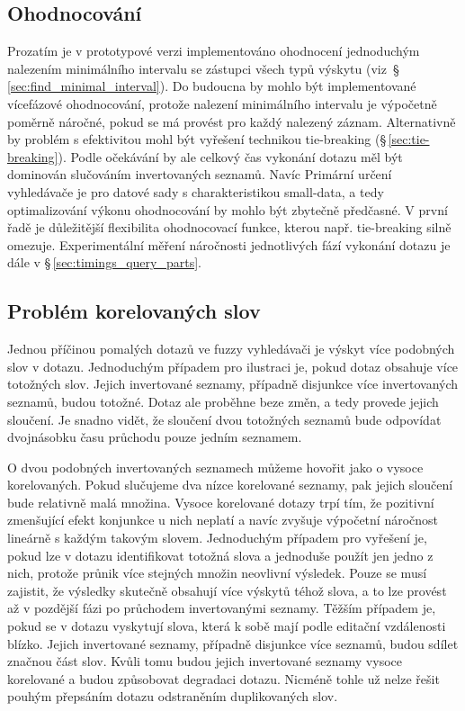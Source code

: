 \documentclass[11pt,letterpaper,oneside,openright]{book}
\begin{document}
\subsection{Ohodnocování}
Prozatím je v prototypové verzi implementováno ohodnocení jednoduchým nalezením
minimálního intervalu se zástupci všech typů výskytu
(viz~\S\,\ref{sec:find_minimal_interval}). Do budoucna by mohlo být
implementované vícefázové ohodnocování, protože nalezení minimálního intervalu
je výpočetně poměrně náročné, pokud se má provést pro každý nalezený záznam.
Alternativně by problém s efektivitou mohl být vyřešení technikou tie-breaking
(\S\,\ref{sec:tie-breaking}). Podle očekávání by ale celkový čas vykonání
dotazu měl být dominován slučováním invertovaných seznamů. Navíc Primární
určení vyhledávače je pro datové sady s charakteristikou small-data, a tedy
optimalizování výkonu ohodnocování by mohlo být zbytečně předčasné. V první
řadě je důležitější flexibilita ohodnocovací funkce, kterou např. tie-breaking
silně omezuje. Experimentální měření náročnosti jednotlivých fází vykonání
dotazu je dále v \S\,\ref{sec:timings_query_parts}.


\subsection{Problém korelovaných slov} \label{sec:correlated_words}
Jednou příčinou pomalých dotazů ve fuzzy vyhledávači je výskyt více podobných
slov v dotazu. Jednoduchým případem pro ilustraci je, pokud dotaz obsahuje více
totožných slov. Jejich invertované seznamy, případně disjunkce více
invertovaných seznamů, budou totožné. Dotaz ale proběhne beze změn, a tedy
provede jejich sloučení. Je snadno vidět, že sloučení dvou totožných seznamů
bude odpovídat dvojnásobku času průchodu pouze jedním seznamem.

O dvou podobných invertovaných seznamech můžeme hovořit jako o vysoce
korelovaných. Pokud slučujeme dva nízce korelované seznamy, pak jejich sloučení
bude relativně malá množina. Vysoce korelované dotazy trpí tím, že pozitivní
zmenšující efekt konjunkce u nich neplatí a navíc zvyšuje výpočetní náročnost
lineárně s každým takovým slovem.  Jednoduchým případem pro vyřešení je, pokud
lze v dotazu identifikovat totožná slova a jednoduše použít jen jedno z nich,
protože průnik více stejných množin neovlivní výsledek. Pouze se musí zajistit,
že výsledky skutečně obsahují více výskytů téhož slova, a to lze provést až v
pozdější fázi po průchodem invertovanými seznamy.  Těžším případem je, pokud se
v dotazu vyskytují slova, která k sobě mají podle editační vzdálenosti blízko.
Jejich invertované seznamy, případně disjunkce více seznamů, budou sdílet
značnou část slov. Kvůli tomu budou jejich invertované seznamy vysoce
korelované a budou způsobovat degradaci dotazu.  Nicméně tohle už nelze řešit
pouhým přepsáním dotazu odstraněním duplikovaných slov.
\end{document}
